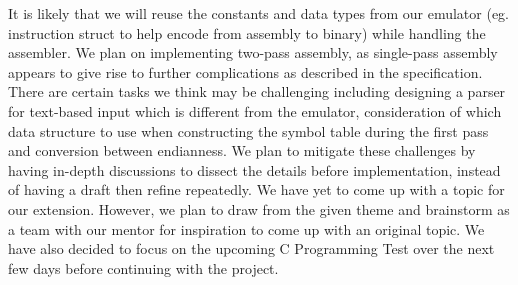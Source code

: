 \documentclass[11pt]{article}
\begin{document}
\begin{flushleft}
It is likely that we will reuse the constants and data types from our emulator (eg. instruction struct to help encode from assembly to binary) while handling the assembler. We plan on implementing two-pass assembly, as single-pass assembly appears to give rise to further complications as described in the specification. There are certain tasks we think may be challenging including designing a parser for text-based input which is different from the emulator, consideration of which data structure to use when constructing the symbol table during the first pass and conversion between endianness. We plan to mitigate these challenges by having in-depth discussions to dissect the details before implementation, instead of having a draft then refine repeatedly. We have yet to come up with a topic for our extension. However, we plan to draw from the given theme and brainstorm as a team with our mentor for inspiration to come up with an original topic. We have also decided to focus on the upcoming C Programming Test over the next few days before continuing with the project. 
\end{flushleft}
\end{document}
